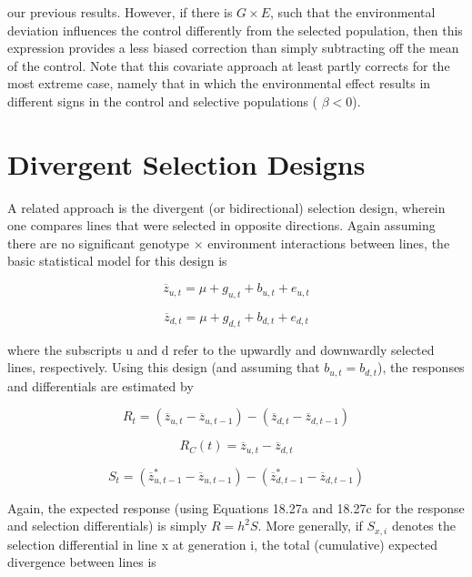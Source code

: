 \documentclass{article}
\begin{document}
our previous results. However, if there is  $ G \times E $, such that the environmental deviation influences the control differently from the selected population, then this expression provides a less biased correction than simply subtracting off the mean of the control. Note that this covariate approach at least partly corrects for the most extreme case, namely that in which the environmental effect results in different signs in the control and selective populations ( $ \beta < 0 $).

\section{Divergent Selection Designs}
A related approach is the divergent (or bidirectional) selection design, wherein one compares lines that were selected in opposite directions. Again assuming there are no significant genotype × environment interactions between lines, the basic statistical model for this design is

\begin{equation}
\overline{z}_{u,t}=\mu+g_{u,t}+b_{u,t}+e_{u,t}
\tag{18.26a}
\label{eq:18_26a}
\end{equation}

\begin{equation}
\overline{z}_{d,t}=\mu+g_{d,t}+b_{d,t}+e_{d,t}
\tag{18.26b}
\label{eq:18_26b}
\end{equation}

where the subscripts u and d refer to the upwardly and downwardly selected lines, respectively. Using this design (and assuming that  $ b_{u,t}=b_{d,t} $), the responses and differentials are estimated by

\begin{equation}
R_{t}=\left(\overline{z}_{u,t}-\overline{z}_{u,t-1}\right)-\left(\overline{z}_{d,t}-\overline{z}_{d,t-1}\right)
\tag{18.27a}
\label{eq:18_27a}
\end{equation}

\begin{equation}
R_{C}(t)=\overline{z}_{u,t}-\overline{z}_{d,t}
\tag{18.27b}
\label{eq:18_27b}
\end{equation}

\begin{equation}
S_{t}=\left(\overline{z}_{u,t-1}^{*}-\overline{z}_{u,t-1}\right)-\left(\overline{z}_{d,t-1}^{*}-\overline{z}_{d,t-1}\right)
\tag{18.27c}
\label{eq:18_27c}
\end{equation}

Again, the expected response (using Equations 18.27a and 18.27c for the response and selection differentials) is simply  $ R = h^{2}S $. More generally, if  $ S_{x,i} $ denotes the selection differential in line x at generation i, the total (cumulative) expected divergence between lines is
\end{document}
